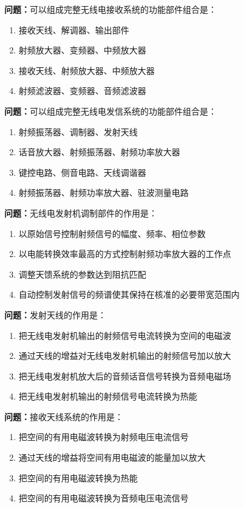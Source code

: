 \documentclass[UTF8]{ctexbook}
\begin{document}
\textbf{问题：}可以组成完整无线电接收系统的功能部件组合是：
\begin{enumerate}[label=\Alph*), leftmargin=3em]
  \item 接收天线、解调器、输出部件
  \item 射频放大器、变频器、中频放大器
  \item 接收天线、射频放大器、中频放大器
  \item 射频滤波器、变频器、音频滤波器
\end{enumerate}

\textbf{问题：}可以组成完整无线电发信系统的功能部件组合是：
\begin{enumerate}[label=\Alph*), leftmargin=3em]
  \item 射频振荡器、调制器、发射天线
  \item 话音放大器、射频振荡器、射频功率放大器
  \item 键控电路、侧音电路、天线调谐器
  \item 射频振荡器、射频功率放大器、驻波测量电路
\end{enumerate}

\textbf{问题：}无线电发射机调制部件的作用是：
\begin{enumerate}[label=\Alph*), leftmargin=3em]
  \item 以原始信号控制射频信号的幅度、频率、相位参数
  \item 以电能转换效率最高的方式控制射频功率放大器的工作点
  \item 调整天馈系统的参数达到阻抗匹配
  \item 自动控制发射信号的频谱使其保持在核准的必要带宽范围内
\end{enumerate}

\textbf{问题：}发射天线的作用是：
\begin{enumerate}[label=\Alph*), leftmargin=3em]
  \item 把无线电发射机输出的射频信号电流转换为空间的电磁波
  \item 通过天线的增益对无线电发射机输出的射频信号加以放大
  \item 把无线电发射机放大后的音频话音信号转换为音频电磁场
  \item 把无线电发射机输出的射频信号电流转换为热能
\end{enumerate}

\textbf{问题：}接收天线系统的作用是：
\begin{enumerate}[label=\Alph*), leftmargin=3em]
  \item 把空间的有用电磁波转换为射频电压电流信号
  \item 通过天线的增益将空间有用电磁波的能量加以放大
  \item 把空间的有用电磁波转换为热能
  \item 把空间的有用电磁波转换为音频电压电流信号
\end{enumerate}
\end{document}
